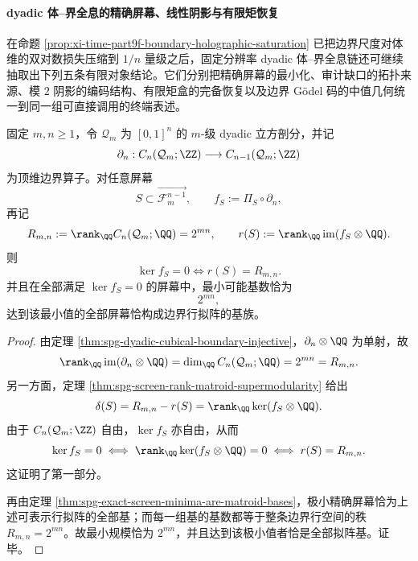 \paragraph{dyadic 体--界全息的精确屏幕、线性阴影与有限矩恢复}
在命题 \ref{prop:xi-time-part9f-boundary-holographic-saturation} 已把边界尺度对体维的双对数损失压缩到 \(1/n\) 量级之后，固定分辨率 dyadic 体--界全息链还可继续抽取出下列五条有限对象结论。它们分别把精确屏幕的最小化、审计缺口的拓扑来源、模 \(2\) 阴影的编码结构、有限矩盒的完备恢复以及边界 Gödel 码的中值几何统一到同一组可直接调用的终端表述。

\begin{theorem}[精确屏幕的最小规模恰等于顶维胞腔数]\label{thm:xi-time-part9fa-exact-screen-minimal-size-matroid-basis}
固定 \(m,n\ge 1\)，令 \(\mathcal Q_m\) 为 \([0,1]^n\) 的 \(m\)-级 dyadic 立方剖分，并记
\[
\partial_n:C_n(\mathcal Q_m;\ZZ)\longrightarrow C_{n-1}(\mathcal Q_m;\ZZ)
\]
为顶维边界算子。对任意屏幕
\[
S\subset \overrightarrow{\mathcal F_m^{n-1}},
\qquad
f_S:=\Pi_S\circ\partial_n,
\]
再记
\[
R_{m,n}:=\rank_{\QQ}C_n(\mathcal Q_m;\QQ)=2^{mn},
\qquad
r(S):=\rank_{\QQ}\operatorname{im}(f_S\otimes\QQ).
\]
则
\[
\ker f_S=0
\iff
r(S)=R_{m,n}.
\]
并且在全部满足 \(\ker f_S=0\) 的屏幕中，最小可能基数恰为
\[
2^{mn},
\]
达到该最小值的全部屏幕恰构成边界行拟阵的基族。
\end{theorem}
\begin{proof}
由定理 \ref{thm:spg-dyadic-cubical-boundary-injective}，\(\partial_n\otimes\QQ\) 为单射，故
\[
\rank_{\QQ}\operatorname{im}(\partial_n\otimes\QQ)=\dim_{\QQ}C_n(\mathcal Q_m;\QQ)=2^{mn}=R_{m,n}.
\]
另一方面，定理 \ref{thm:spg-screen-rank-matroid-supermodularity} 给出
\[
\delta(S)=R_{m,n}-r(S)=\rank_{\QQ}\ker(f_S\otimes\QQ).
\]
由于 \(C_n(\mathcal Q_m;\ZZ)\) 自由，\(\ker f_S\) 亦自由，从而
\[
\ker f_S=0
\iff
\rank_{\QQ}\ker(f_S\otimes\QQ)=0
\iff
r(S)=R_{m,n}.
\]
这证明了第一部分。

再由定理 \ref{thm:spg-exact-screen-minima-are-matroid-bases}，极小精确屏幕恰为上述可表示行拟阵的全部基；而每一组基的基数都等于整条边界行空间的秩 \(R_{m,n}=2^{mn}\)。故最小规模恰为 \(2^{mn}\)，并且达到该极小值者恰是全部拟阵基。证毕。
\end{proof}

